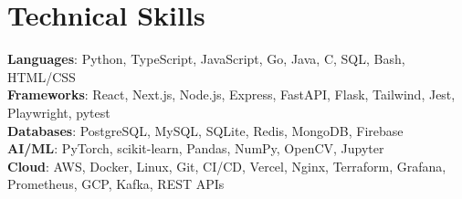 \documentclass[letterpaper,11pt]{article}
\newlength{\skilltop}\setlength{\skilltop}{1.4pt}
\begin{document}
%
\section{Technical Skills}
 \vspace{\skilltop}\begin{itemize}[leftmargin=0.15in, label={}, topsep=0pt, partopsep=0pt]
    \small{\item{
     \textbf{Languages}{: Python, TypeScript, JavaScript, Go, Java, C, SQL, Bash, HTML/CSS} \\
     \textbf{Frameworks}{: React, Next.js, Node.js, Express, FastAPI, Flask, Tailwind, Jest, Playwright, pytest} \\
     \textbf{Databases}{: PostgreSQL, MySQL, SQLite, Redis, MongoDB, Firebase} \\
     \textbf{AI/ML}{: PyTorch, scikit-learn, Pandas, NumPy, OpenCV, Jupyter} \\
     \textbf{Cloud}{: AWS, Docker, Linux, Git, CI/CD, Vercel, Nginx, Terraform, Grafana, Prometheus, GCP, Kafka, REST APIs}

    }}
 \end{itemize}


\end{document}

